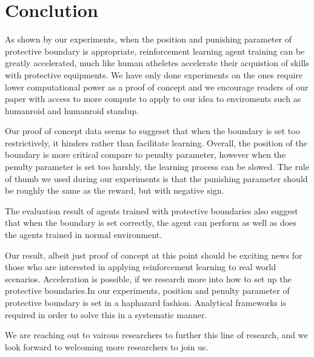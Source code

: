 \documentclass[journal]{IEEEtran}
\begin{document}
\section{Conclution}
As shown by our experiments, when the position and punishing parameter of protective boundary is appropriate, reinforcement learning agent training can be greatly accelerated, much like human atheletes accelerate their acquistion of skills with protective equipments. We have only done experiments on the ones require lower computational power as a proof of concept and we encourage readers of our paper with access to more compute to apply to our idea to enviroments such as humanroid and humanroid standup.

 Our proof of concept data seems to suggeset that when the boundary is set too restrictively, it hinders rather than facilitate learning. Overall, the position of the boundary is more critical compare to penulty parameter, however when the penulty parameter is set too harshly, the learning process can be slowed. The rule of thumb we used during our experiments is that the punishing parameter should be roughly the same as the reward, but with negative sign.

 The evaluation result of agents trained with protective boundaries also suggest that when the boundary is set correctly, the agent can perform as well as does the agents trained in normal environment.

 Our result, albeit just proof of concept at this point should be exciting news for those who are interested in applying reinforcement learning to real world scenarios. Acceleration is possible, if we research more into how to set up the protective boundaries.In our experiments, position and penulty parameter of protective boundary is set in a haphazard fashion. Analytical frameworks is required in order to solve this in a systematic manner.

 We are reaching out to vairous researchers to further this line of research, and we look forward to welcoming more researchers to join us.



\end{document}
